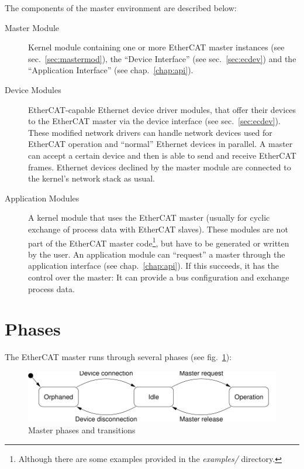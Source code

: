 \documentclass[a4paper,12pt,BCOR6mm,bibtotoc,idxtotoc]{scrbook}
\begin{document}
The components of the master environment are described below:

\begin{description}

\item[Master Module] Kernel module containing one or more
EtherCAT master instances (see sec.~\ref{sec:mastermod}), the ``Device
Interface'' (see sec.~\ref{sec:ecdev}) and the ``Application Interface'' (see
chap.~\ref{chap:api}).

\item[Device Modules] EtherCAT-capable Ethernet device
driver modules, that offer their devices to the EtherCAT
master via the device interface (see sec.~\ref{sec:ecdev}). These modified
network drivers can handle network devices used for EtherCAT operation and
``normal'' Ethernet devices in parallel. A master can accept a certain device
and then is able to send and receive EtherCAT frames. Ethernet devices
declined by the master module are connected to the kernel's network stack as
usual.

\item[Application Modules] A kernel module that uses the
EtherCAT master (usually for cyclic exchange of process data with EtherCAT
slaves). These modules are not part of the EtherCAT master
code\footnote{Although there are some examples provided in the
\textit{examples/} directory.}, but have to be generated or written by the
user. An application module can ``request'' a master through the application
interface (see chap.~\ref{chap:api}). If this succeeds, it has the control
over the master: It can provide a bus configuration and exchange process data.

\end{description}


\section{Phases}

The EtherCAT master runs through several phases (see fig.~\ref{fig:phases}):

\begin{figure}[htbp]
  \centering
  \includegraphics[width=.9\textwidth]{images/phases}
  \caption{Master phases and transitions}
  \label{fig:phases}
\end{figure}
\end{document}
